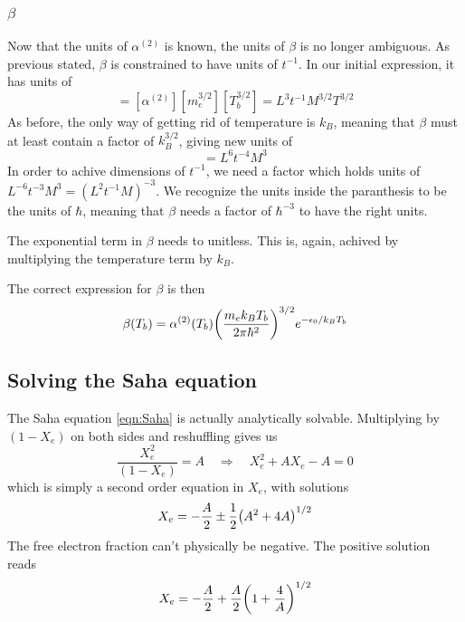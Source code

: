 \documentclass[10pt, a4paper]{article}
\begin{document}
\subsubsection{\texorpdfstring{\textbf{$\beta$}}{TEXT} }
Now that the units of $\alpha^{(2)}$ is known, the units of $\beta$ is no longer ambiguous. As previous stated, $\beta$ is constrained to have units of $t^{-1}$. In our initial expression, it has units of
\begin{equation*}
    [\beta] = [\alpha^{(2)}][m_e^{3/2}][T_b^{3/2}] = L^3t^{-1}M^{3/2}T^{3/2}
\end{equation*}
As before, the only way of getting rid of temperature is $k_B$, meaning that $\beta$ must at least contain a factor of $k_B^{3/2}$, giving new units of
\begin{equation*}
    [\beta][k_B^{3/2}] = L^6t^{-4}M^3
\end{equation*}
In order to achive dimensions of $t^{-1}$, we need a factor which holds units of $L^{-6}t^{-3}M^3 = (L^2t^{-1}M)^{-3}$. We recognize the units inside the paranthesis to be the units of $\hbar$, meaning that $\beta$ needs a factor of $\hbar^{-3}$ to have the right units.

The exponential term in $\beta$ needs to unitless. This is, again, achived by multiplying the temperature term by $k_B$.

The correct expression for $\beta$ is then
\begin{equation*}
    \beta\qty(T_{b}) = \alpha^{(2)}\qty(T_{b}) \qty(\frac{m_{e} k_B T_{b}}{2 \pi \hbar^2})^{3 / 2} e^{-\epsilon_{0} / k_BT_{b}}
\end{equation*}


\subsection{Solving the Saha equation}
The Saha equation \ref{eqn:Saha} is actually analytically solvable. Multiplying by $(1-X_e)$ on both sides and reshuffling gives us
\begin{equation*}
    \frac{X_e^2}{(1-X_e)} = A \quad \Rightarrow \quad X_e^2 + AX_e - A = 0
\end{equation*}
which is simply a second order equation in $X_e$, with solutions
\begin{equation*}
    X_e = - \frac{A}{2} \pm \frac{1}{2}\qty(A^2 + 4A)^{1/2}
\end{equation*}
The free electron fraction can't physically be negative. The positive solution reads
\begin{equation}\label{eqn:Saha_sol}
    X_e = - \frac{A}{2} + \frac{A}{2}\qty(1 + \frac{4}{A})^{1/2}
\end{equation}
\end{document}
